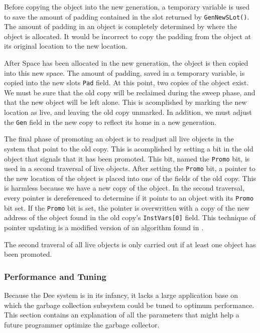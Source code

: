 Before copying the object into the new generation, a temporary
variable is used to save the amount of padding contained in the slot
returned by {\tt GenNewSLot()}.  The amount of padding in an object is
completely determined by where the object is allocated.  It would be
incorrect to copy the padding from the object at its original location
to the new location. 

After Space has been allocated in the new generation, the object is
then copied into this new space.  The amount of padding, saved in a
temporary variable, is copied into the new slots {\tt Pad} field.  At
this point, two copies of the object exist.  We must be sure that the
old copy will be reclaimed during the sweep phase, and that the new
object will be left alone.  This is acomplished by marking the new
location as live, and leaving the old copy unmarked.  In addition, we
must adjust the {\tt Gen} field in the new copy to reflect its home in
a new generation.

The final phase of promoting an object is to readjust all live objects
in the system that point to the old copy.  This is acomplished by
setting a bit in the old object that signals that it has been promoted.
This bit, named the {\tt Promo} bit, is used in a second traversal of
live objects.  After setting the {\tt Promo} bit, a pointer to the new
location of the object is placed into one of the fields of the old copy.
This is harmless because we have a new copy of the object.  In the
second traversal, every pointer is dereferenced to determine if it
points to an object with its {\tt Promo} bit set.  If the {\tt Promo}
bit is set, the pointer is overwritten with a copy of the new address
of the object found in the old copy's {\tt InstVars[0]} field.  This
technique of pointer updating is a modified version of an algorithm
found in \cite{Cohen83}.

The second traveral of all live objects is only carried out if at
least one object has been promoted.

\subsubsection{Performance and Tuning}

Because the Dee system is in its infancy, it lacks a large application
base on which the garbage collection subsystem could be tuned to
optimum performance.  This section contains an explanation of all the
parameters that might help a future programmer optimize the garbage
collector.

